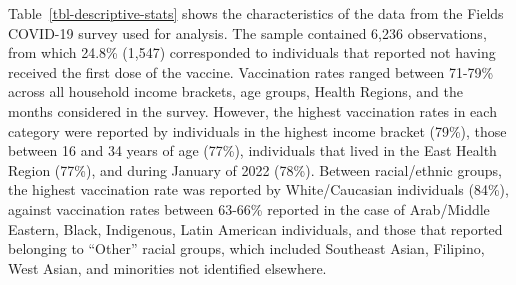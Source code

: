 \documentclass[
  letterpaper,
  DIV=11,
  numbers=noendperiod]{scrartcl}
\begin{document}
Table~\ref{tbl-descriptive-stats} shows the characteristics of the data
from the Fields COVID-19 survey used for analysis. The sample contained
6,236 observations, from which 24.8\% (1,547) corresponded to
individuals that reported not having received the first dose of the
vaccine. Vaccination rates ranged between 71-79\% across all household
income brackets, age groups, Health Regions, and the months considered
in the survey. However, the highest vaccination rates in each category
were reported by individuals in the highest income bracket (79\%), those
between 16 and 34 years of age (77\%), individuals that lived in the
East Health Region (77\%), and during January of 2022 (78\%). Between
racial/ethnic groups, the highest vaccination rate was reported by
White/Caucasian individuals (84\%), against vaccination rates between
63-66\% reported in the case of Arab/Middle Eastern, Black, Indigenous,
Latin American individuals, and those that reported belonging to
``Other'' racial groups, which included Southeast Asian, Filipino, West
Asian, and minorities not identified elsewhere.
\end{document}
